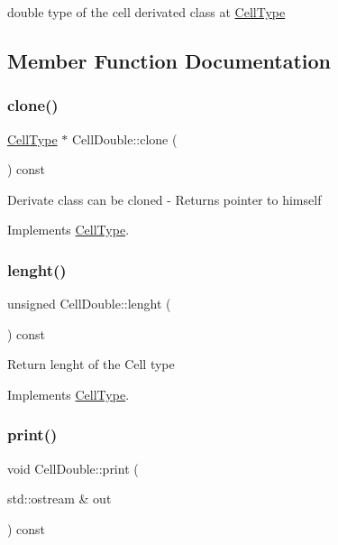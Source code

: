 double type of the cell derivated class at \hyperlink{class_cell_type}{Cell\+Type} 

\subsection{Member Function Documentation}
\mbox{\label{class_cell_double_a8d378687ae89338267e61d61ff932680}} 
\subsubsection{\texorpdfstring{clone()}{clone()}}
{\footnotesize\ttfamily \hyperlink{class_cell_type}{Cell\+Type} $\ast$ Cell\+Double\+::clone (\begin{DoxyParamCaption}{ }\end{DoxyParamCaption}) const\hspace{0.3cm}{\ttfamily [virtual]}}

Derivate class can be cloned -\/ Returns pointer to himself 

Implements \hyperlink{class_cell_type_a8c534b1eed27659429f761fc76d51b89}{Cell\+Type}.

\mbox{\label{class_cell_double_ac2d36517f1107fb0271172ea30d6bff5}} 
\subsubsection{\texorpdfstring{lenght()}{lenght()}}
{\footnotesize\ttfamily unsigned Cell\+Double\+::lenght (\begin{DoxyParamCaption}{ }\end{DoxyParamCaption}) const\hspace{0.3cm}{\ttfamily [virtual]}}

Return lenght of the Cell type 

Implements \hyperlink{class_cell_type_a1f8bd268dbd474dd8e08726a6efac066}{Cell\+Type}.

\mbox{\label{class_cell_double_a90539ceb6daa29e7b658d8f2a2d1445d}} 
\subsubsection{\texorpdfstring{print()}{print()}}
{\footnotesize\ttfamily void Cell\+Double\+::print (\begin{DoxyParamCaption}\item[{std\+::ostream \&}]{out }\end{DoxyParamCaption}) const\hspace{0.3cm}{\ttfamily [virtual]}}

